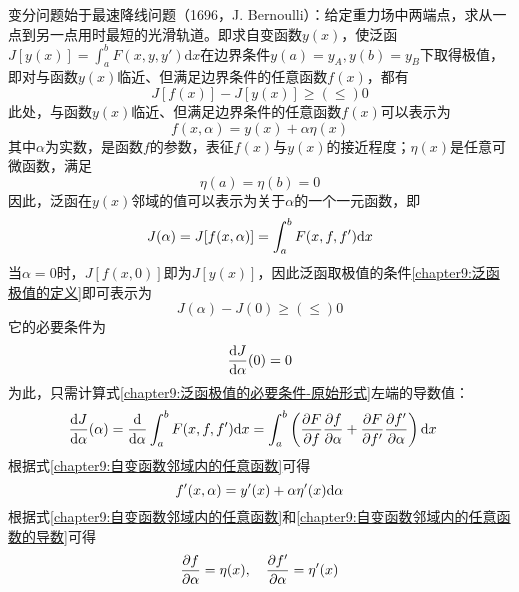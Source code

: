 变分问题始于最速降线问题（1696，J. Bernoulli）：给定重力场中两端点，求从一点到另一点用时最短的光滑轨道。即求自变函数$y(x)$，使泛函$\displaystyle J[y(x)] = \int_a^b F(x,y,y') \mathrm{d} x$在边界条件$y(a) = y_A,y(b) = y_B$下取得极值，即对与函数$y(x)$临近、但满足边界条件的任意函数$f(x)$，都有
\begin{equation}
	J[f(x)]-J[y(x)]\geqslant(\leqslant) 0
	\label{chapter9:泛函极值的定义}
\end{equation}
此处，与函数$y(x)$临近、但满足边界条件的任意函数$f(x)$可以表示为
\begin{equation}
	f(x,\alpha) = y(x)+\alpha\eta(x)
	\label{chapter9:自变函数邻域内的任意函数}
\end{equation}
其中$\alpha$为实数，是函数$f$的参数，表征$f(x)$与$y(x)$的接近程度；$\eta(x)$是任意可微函数，满足
\begin{equation}
	\eta(a)=\eta(b)=0
	\label{chapter9:任意函数的固定边界条件}
\end{equation}
因此，泛函在$y(x)$邻域的值可以表示为关于$\alpha$的一个一元函数，即
\begin{equation}
	J(\alpha)=J[f(x,\alpha)] = \int_a^b F(x,f,f')\mathrm{d} x
	\label{chapter9:将泛函转化为关于自变函数参数的一元函数}
\end{equation}
当$\alpha=0$时，$J[f(x,0)]$即为$J[y(x)]$，因此泛函取极值的条件\eqref{chapter9:泛函极值的定义}即可表示为
\begin{equation}
	J(\alpha)-J(0)\geqslant(\leqslant) 0
\end{equation}
它的必要条件为
\begin{equation}
	\dfrac{\mathrm{d} J}{\mathrm{d} \alpha}(0) = 0
	\label{chapter9:泛函极值的必要条件-原始形式}
\end{equation}
为此，只需计算式\eqref{chapter9:泛函极值的必要条件-原始形式}左端的导数值：
\begin{align}
	\dfrac{\mathrm{d} J}{\mathrm{d} \alpha}(\alpha) & = \dfrac{\mathrm{d}}{\mathrm{d} \alpha}\int_a^b F(x,f,f')\mathrm{d} x = \int_a^b\left(\frac{\partial F}{\partial f}\frac{\partial f}{\partial \alpha} + \frac{\partial F}{\partial f'}\frac{\partial f'}{\partial \alpha}\right)\mathrm{d} x
	\label{chapter9:泛函对参数的导数-初步}
\end{align}
根据式\eqref{chapter9:自变函数邻域内的任意函数}可得
\begin{equation}
	f'(x,\alpha) = y'(x)+\alpha\eta'(x)\mathrm{d}\alpha
	\label{chapter9:自变函数邻域内的任意函数的导数}
\end{equation}
根据式\eqref{chapter9:自变函数邻域内的任意函数}和\eqref{chapter9:自变函数邻域内的任意函数的导数}可得
\begin{equation}
	\frac{\partial f}{\partial \alpha} = \eta(x),\quad \frac{\partial f'}{\partial \alpha} = \eta'(x)
	\label{chapter9:自变函数邻域内的任意函数的导数-导出式}
\end{equation}
